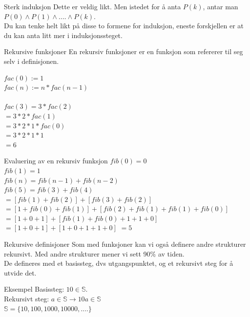 \begin{frame}{Sterk induksjon}
    Dette er veldig likt. Men istedet for å anta $P(k)$, antar man $P(0) \land P(1) \land .... \land P(k)$.\\
    Du kan tenke helt likt på disse to formene for induksjon, eneste forskjellen er at du kan anta litt mer i induksjonssteget.
\end{frame}

\begin{frame}{Rekursive funksjoner}
    En rekursiv funksjoner er en funksjon som refererer til seg selv i definisjonen.\\
    \pause
    \begin{block}
        $fac(0) := 1$\\
        $fac(n) := n * fac(n-1)$\\\\
        
        \pause
        $fac(3) = 3 * fac(2)$\\
        $= 3 * 2 * fac(1)$\\
        $= 3 * 2 * 1 * fac(0)$\\
        $= 3 * 2 * 1 * 1$\\
        $= 6$
    \end{block}
\end{frame}

\begin{frame}{Evaluering av en rekursiv funksjon}
    $fib(0) = 0$\\
    $fib(1) = 1$\\
    $fib(n) = fib(n-1) + fib(n-2)$\\
    \pause
    $fib(5) = fib(3) + fib(4)$\\
    $ = [fib(1) + fib(2)] + [fib(3) + fib(2)]$\\
    $ = [1 + fib(0) + fib(1)] + [fib(2) + fib(1) + fib(1) + fib(0)]$\\
    $ = [1 + 0 + 1] + [fib(1) + fib(0) + 1 + 1 + 0]$\\
    $ = [1 + 0 + 1] + [1 + 0 + 1 + 1 + 0]$
    $ = 5$
\end{frame}

\begin{frame}{Rekursive definisjoner}
    Som med funksjoner kan vi også definere andre strukturer rekursivt. Med andre strukturer mener vi sett 90\% av tiden.\\
    
    De defineres med et basissteg, dvs utgangspunktet, og et rekursivt steg for å utvide det.\\
    
    \pause
    \begin{block}{Eksempel}
        Basissteg: $10 \in \mathbb{S}$.\\
        Rekursivt steg: $a \in \mathbb{S} \rightarrow 10a \in \mathbb{S}$\\
        $\mathbb{S} = \{10, 100, 1000, 10000, ....\}$
    \end{block}
\end{frame}

